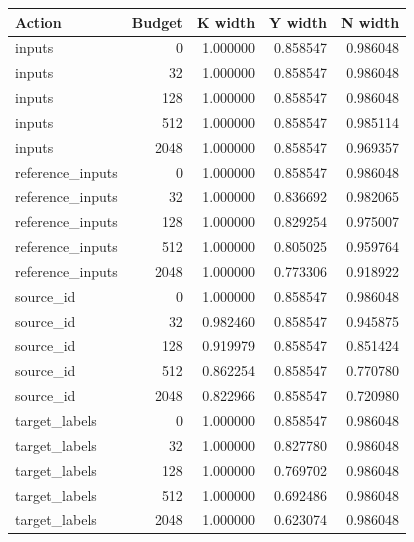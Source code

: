 \begingroup\small
\setlength{\tabcolsep}{4pt}
\begin{longtable}{lrrrr}
\toprule

Action & Budget & K width & Y width & N width\\\midrule\endhead

inputs & 0 & 1.000000 & 0.858547 & 0.986048\\

inputs & 32 & 1.000000 & 0.858547 & 0.986048\\

inputs & 128 & 1.000000 & 0.858547 & 0.986048\\

inputs & 512 & 1.000000 & 0.858547 & 0.985114\\

inputs & 2048 & 1.000000 & 0.858547 & 0.969357\\

reference\_inputs & 0 & 1.000000 & 0.858547 & 0.986048\\

reference\_inputs & 32 & 1.000000 & 0.836692 & 0.982065\\

reference\_inputs & 128 & 1.000000 & 0.829254 & 0.975007\\

reference\_inputs & 512 & 1.000000 & 0.805025 & 0.959764\\

reference\_inputs & 2048 & 1.000000 & 0.773306 & 0.918922\\

source\_id & 0 & 1.000000 & 0.858547 & 0.986048\\

source\_id & 32 & 0.982460 & 0.858547 & 0.945875\\

source\_id & 128 & 0.919979 & 0.858547 & 0.851424\\

source\_id & 512 & 0.862254 & 0.858547 & 0.770780\\

source\_id & 2048 & 0.822966 & 0.858547 & 0.720980\\

target\_labels & 0 & 1.000000 & 0.858547 & 0.986048\\

target\_labels & 32 & 1.000000 & 0.827780 & 0.986048\\

target\_labels & 128 & 1.000000 & 0.769702 & 0.986048\\

target\_labels & 512 & 1.000000 & 0.692486 & 0.986048\\

target\_labels & 2048 & 1.000000 & 0.623074 & 0.986048\\

\bottomrule
\end{longtable}
\endgroup

